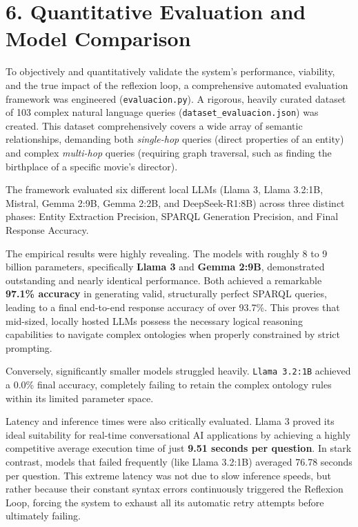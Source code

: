 \section*{6. Quantitative Evaluation and Model Comparison}

To objectively and quantitatively validate the system's performance, viability, and the true impact of the reflexion loop, a comprehensive automated evaluation framework was engineered (\texttt{evaluacion.py}). A rigorous, heavily curated dataset of 103 complex natural language queries (\texttt{dataset\_evaluacion.json}) was created. This dataset comprehensively covers a wide array of semantic relationships, demanding both \textit{single-hop} queries (direct properties of an entity) and complex \textit{multi-hop} queries (requiring graph traversal, such as finding the birthplace of a specific movie's director).

The framework evaluated six different local LLMs (Llama 3, Llama 3.2:1B, Mistral, Gemma 2:9B, Gemma 2:2B, and DeepSeek-R1:8B) across three distinct phases: Entity Extraction Precision, SPARQL Generation Precision, and Final Response Accuracy.

The empirical results were highly revealing. The models with roughly 8 to 9 billion parameters, specifically \textbf{Llama 3} and \textbf{Gemma 2:9B}, demonstrated outstanding and nearly identical performance. Both achieved a remarkable \textbf{97.1\% accuracy} in generating valid, structurally perfect SPARQL queries, leading to a final end-to-end response accuracy of over 93.7\%. This proves that mid-sized, locally hosted LLMs possess the necessary logical reasoning capabilities to navigate complex ontologies when properly constrained by strict prompting.

Conversely, significantly smaller models struggled heavily. \texttt{Llama 3.2:1B} achieved a 0.0\% final accuracy, completely failing to retain the complex ontology rules within its limited parameter space. 

Latency and inference times were also critically evaluated. Llama 3 proved its ideal suitability for real-time conversational AI applications by achieving a highly competitive average execution time of just \textbf{9.51 seconds per question}. In stark contrast, models that failed frequently (like Llama 3.2:1B) averaged 76.78 seconds per question. This extreme latency was not due to slow inference speeds, but rather because their constant syntax errors continuously triggered the Reflexion Loop, forcing the system to exhaust all its automatic retry attempts before ultimately failing.

